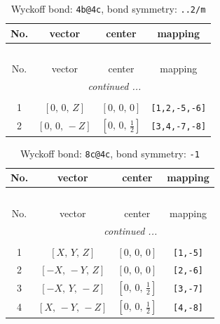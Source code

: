 \documentclass[fleqn,8pt]{jsarticle}
\begin{document}
\renewcommand{\arraystretch}{1.2}
\begin{longtable}{cccc}
\caption{Wyckoff bond: {\tt 4b@4c}, bond symmetry: {\tt ..2/m}}
 \\
 \hline \hline
No. & vector & center & mapping \\ \hline \endfirsthead

\multicolumn{3}{l}{\tablename\ \thetable{}} \\
 \hline \hline
No. & vector & center & mapping \\ \hline \endhead

 \hline \hline
\multicolumn{3}{r}{\footnotesize\it continued ...} \\ \endfoot

 \hline \hline
\multicolumn{3}{r}{} \\ \endlastfoot

1 & $\left[ 0,\, 0,\, Z \right]$ & $\left[ 0,\, 0,\, 0 \right]$ & {\tt [1,2,-5,-6]} \\ \hline
2 & $\left[ 0,\, 0,\, - Z \right]$ & $\left[ 0,\, 0,\, \frac{1}{2} \right]$ & {\tt [3,4,-7,-8]} \\
\end{longtable}
\renewcommand{\arraystretch}{1.2}
\begin{longtable}{cccc}
\caption{Wyckoff bond: {\tt 8c@4c}, bond symmetry: {\tt -1}}
 \\
 \hline \hline
No. & vector & center & mapping \\ \hline \endfirsthead

\multicolumn{3}{l}{\tablename\ \thetable{}} \\
 \hline \hline
No. & vector & center & mapping \\ \hline \endhead

 \hline \hline
\multicolumn{3}{r}{\footnotesize\it continued ...} \\ \endfoot

 \hline \hline
\multicolumn{3}{r}{} \\ \endlastfoot

1 & $\left[ X,\, Y,\, Z \right]$ & $\left[ 0,\, 0,\, 0 \right]$ & {\tt [1,-5]} \\ \hline
2 & $\left[ - X,\, - Y,\, Z \right]$ & $\left[ 0,\, 0,\, 0 \right]$ & {\tt [2,-6]} \\ \hline
3 & $\left[ - X,\, Y,\, - Z \right]$ & $\left[ 0,\, 0,\, \frac{1}{2} \right]$ & {\tt [3,-7]} \\ \hline
4 & $\left[ X,\, - Y,\, - Z \right]$ & $\left[ 0,\, 0,\, \frac{1}{2} \right]$ & {\tt [4,-8]} \\
\end{longtable}
\end{document}
